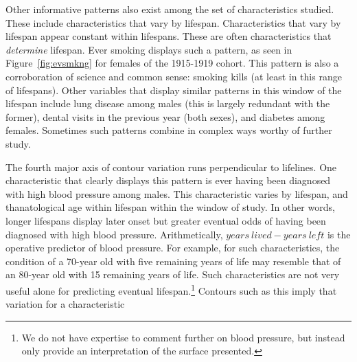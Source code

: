 \documentclass[11pt,oneside]{article} %
\begin{document}
Other informative patterns also exist among the set of characteristics studied.
These include characteristics that vary by lifespan. Characteristics that vary
by lifespan appear constant within lifespans. These are often characteristics that
\textit{determine} lifespan. Ever smoking displays such a pattern, as seen in
Figure~\ref{fig:evsmkng} for females of the 1915-1919 cohort. This pattern is
also a corroboration of science and common sense: smoking kills (at least in
this range of lifespans). Other variables that display similar patterns in this
window of the lifespan include lung disease among males (this is largely
redundant with the former), dental visits in the previous year (both sexes),
and diabetes among females. Sometimes such patterns combine in complex ways
worthy of further study.

The fourth major axis of contour variation runs perpendicular to lifelines. One
characteristic that clearly displays this pattern is ever having been
diagnosed with high blood pressure among males. This characteristic varies by
lifespan, and thanatological age within lifespan within the window of study.
In other words, longer lifespans display later onset but greater eventual odds of
having been diagnosed with high blood pressure. Arithmetically, $years~lived - years~left$ is the
operative predictor of blood pressure. For example, for
such characteristics, the condition of a 70-year old with five
remaining years of life may resemble that of an 80-year old with
15 remaining years of life. Such characteristics are not very useful alone for
predicting eventual lifespan.\footnote{We do not have expertise to comment further on blood pressure, but instead only provide an interpretation of the surface presented.} Contours such as this imply that variation for a characteristic
\end{document}
